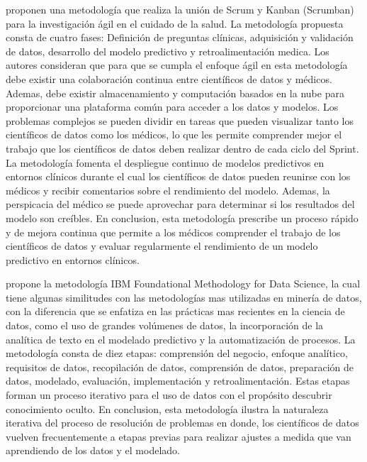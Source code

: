 \citep{Lei2020} proponen una metodología que realiza la unión de Scrum y Kanban (Scrumban) para la investigación ágil en el cuidado de la salud. La metodología propuesta consta de cuatro fases: Definición de preguntas clínicas, adquisición y validación de datos, desarrollo del modelo predictivo y retroalimentación medica. Los autores consideran que para que se cumpla el enfoque ágil en esta metodología debe existir una colaboración continua entre científicos de datos y médicos. Ademas, debe existir almacenamiento y computación basados en la nube para proporcionar una plataforma común para acceder a los datos y modelos. Los problemas complejos se pueden dividir en tareas que pueden visualizar tanto los científicos de datos como los médicos, lo que les permite comprender mejor el trabajo que los científicos de datos deben realizar dentro de cada ciclo del Sprint. La metodología fomenta el despliegue continuo de modelos predictivos en entornos clínicos durante el cual los científicos de datos pueden reunirse con los médicos y recibir comentarios sobre el rendimiento del modelo. Ademas, la perspicacia del médico se puede aprovechar para determinar si los resultados del modelo son creíbles. En conclusion, esta metodología prescribe un proceso rápido y de mejora continua que permite a los médicos comprender el trabajo de los científicos de datos y evaluar regularmente el rendimiento de un modelo predictivo en entornos clínicos.

\citep{Rollins2015} propone la metodología IBM Foundational Methodology for Data Science, la cual tiene algunas similitudes con las metodologías mas utilizadas en minería de datos, con la diferencia que se enfatiza en las prácticas mas recientes en la ciencia de datos, como el uso de grandes volúmenes de datos, la incorporación de la analítica de texto en el modelado predictivo y la automatización de procesos. La metodología consta de diez etapas: comprensión del negocio, enfoque analítico, requisitos de datos, recopilación de datos, comprensión de datos, preparación de datos, modelado, evaluación, implementación y retroalimentación. Estas etapas  forman un proceso iterativo para el uso de datos con el propósito  descubrir conocimiento oculto. En conclusion, esta metodología ilustra la naturaleza iterativa del proceso de resolución de problemas en donde, los científicos de datos vuelven frecuentemente a etapas previas para realizar ajustes a medida que van aprendiendo de los datos y el modelado.  

